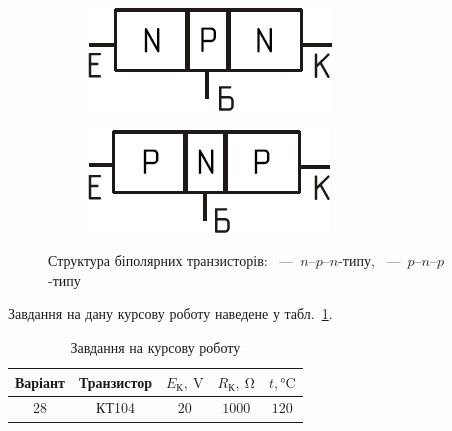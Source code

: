 \documentclass[14pt,ukrainian,utf8,simple]{eskdtext}
\begin{document}
		\begin{figure}[!htbp]
		\centering
			\begin{subfigure}[t]{0.5\textwidth - 0.5em}
			\centering
				\includegraphics[height = 2\baselineskip]{assets/npn-transistor-cross-section.png}
			\caption{}
			\label{subfig:npn-transistor-cross-section}
			\end{subfigure}%
			\quad
			\begin{subfigure}[t]{0.5\textwidth - 0.5em}
			\centering
				\includegraphics[height = 2\baselineskip]{assets/pnp-transistor-cross-section.png}
			\caption{}
			\label{subfig:pnp-transistor-cross-section}
			\end{subfigure}
		\caption{Структура біполярних транзисторів: ~—~\mbox{$n$–$p$–$n$}-типу, ~—~\mbox{$p$–$n$–$p$}-типу}
		\label{fig:transistors-structure}
		\end{figure}
		
		
		Завдання на дану курсову роботу наведене у табл.~\ref{tab:coursework-task}.
		\begin{table}[!htbp]
		\centering
			\begin{tabular}{|c|c|c|c|c|}
				\hline
					Варіант & Транзистор & $E_{\text{К}},~\si{\volt}$ & $R_{\text{К}},~\si{\ohm}$ & $t, \si{\degreeCelsius}$\\
				\hline
					28      & КТ104      & $20$                      & $1000$                    & $120$\\
				\hline
			\end{tabular}
		\caption{Завдання на курсову роботу}
		\label{tab:coursework-task}
		\end{table}
	
\end{document}
